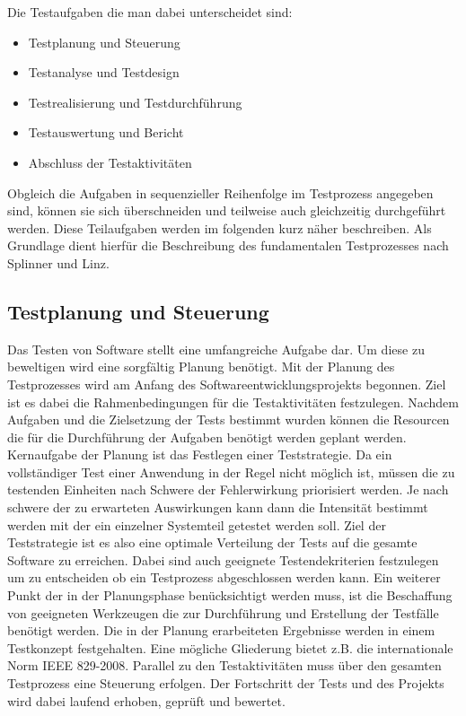 Die Testaufgaben die man dabei unterscheidet sind:

\begin{itemize}
	  \itemsep0pt
      \item Testplanung und Steuerung
      \item Testanalyse und Testdesign
      \item Testrealisierung und Testdurchführung
      \item Testauswertung und Bericht
      \item Abschluss der Testaktivitäten       
\end{itemize}

Obgleich die Aufgaben in sequenzieller Reihenfolge im Testprozess angegeben sind, können sie sich überschneiden und teilweise auch gleichzeitig durchgeführt werden. Diese Teilaufgaben werden im folgenden kurz näher beschreiben. Als Grundlage dient hierfür die Beschreibung des fundamentalen Testprozesses nach Splinner und Linz. \cite[S.20ff]{spillner_basiswissen_2007}

\subsection{Testplanung und Steuerung}
\label{subsec:testplanung_und_steuerung}
Das Testen von Software stellt eine umfangreiche Aufgabe dar. Um diese zu beweltigen wird eine sorgfältig Planung benötigt.
Mit der Planung des Testprozesses wird am Anfang des Softwareentwicklungsprojekts begonnen.
Ziel ist es dabei die Rahmenbedingungen für die Testaktivitäten festzulegen.
Nachdem Aufgaben und die Zielsetzung der Tests bestimmt wurden können die Resourcen die für die Durchführung der Aufgaben benötigt werden geplant werden.
Kernaufgabe der Planung ist das Festlegen einer Teststrategie. Da ein vollständiger Test einer Anwendung in der Regel nicht möglich ist, müssen die zu testenden Einheiten nach Schwere der Fehlerwirkung priorisiert werden. Je nach schwere der zu erwarteten Auswirkungen kann dann die Intensität bestimmt werden mit der ein einzelner Systemteil getestet werden soll.
Ziel der Teststrategie ist es also eine optimale Verteilung der Tests auf die gesamte Software zu erreichen.
Dabei sind auch geeignete Testendekriterien festzulegen um zu entscheiden ob ein Testprozess abgeschlossen werden kann.
Ein weiterer Punkt der in der Planungsphase benücksichtigt werden muss, ist die Beschaffung von geeigneten Werkzeugen die zur Durchführung und Erstellung der Testfälle benötigt werden.
Die in der Planung erarbeiteten Ergebnisse werden in einem Testkonzept festgehalten.
Eine mögliche Gliederung bietet z.B. die internationale Norm IEEE 829-2008. \cite{ieee_ieee_2008}
Parallel zu den Testaktivitäten muss über den gesamten Testprozess eine Steuerung erfolgen.
Der Fortschritt der Tests und des Projekts wird dabei laufend erhoben, geprüft und bewertet.

